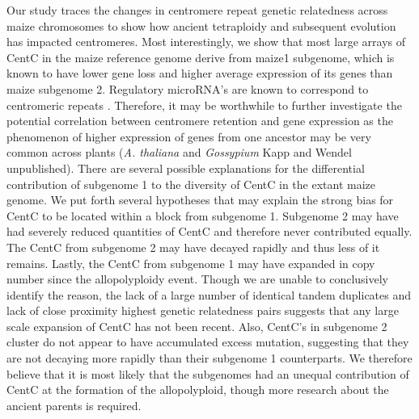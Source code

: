 Our study traces the changes in centromere repeat genetic relatedness across maize chromosomes to show how ancient tetraploidy and subsequent evolution has impacted centromeres.  Most interestingly, we show that most large arrays of CentC in the maize reference genome derive from maize1 subgenome, which is known to have lower gene loss and higher average expression of its genes than maize subgenome 2.  Regulatory microRNA’s are known to correspond to centromeric repeats \citep{ReinhartBartel2002}.  Therefore, it may be worthwhile to further investigate the potential correlation between centromere retention and gene expression as the phenomenon of higher expression of genes from one ancestor may be very common across plants (\emph{A. thaliana} \cite{Cheng2012} and \emph{Gossypium} Kapp and Wendel unpublished).   There are several possible explanations for the differential contribution of subgenome 1 to the diversity of CentC in the extant maize  genome. We put forth several hypotheses that may explain the strong bias for CentC to be located within a block from subgenome 1. Subgenome 2 may have had severely reduced quantities of CentC and therefore never contributed equally.  The CentC from subgenome 2 may have decayed rapidly and thus less of it remains.  Lastly, the CentC from subgenome 1 may have expanded in copy number since the allopolyploidy event.  Though we are unable to conclusively identify the reason, the lack of a large number of identical tandem duplicates  and lack of close proximity highest genetic relatedness pairs suggests that any large scale expansion of CentC has not been recent.  Also, CentC’s in subgenome 2 cluster do not appear to have accumulated excess mutation, suggesting that they are not decaying more rapidly than their subgenome 1 counterparts.  We therefore believe that it is most likely that the subgenomes had an unequal contribution of CentC at the formation of the allopolyploid, though more research about the ancient parents is required.  

